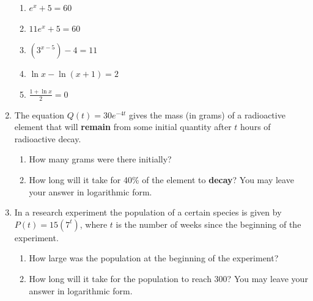 \documentclass[12pt]{article}
\newif\ifans
\begin{document}
\begin{enumerate}
\begin{enumerate}

\item $\displaystyle e^{x}+5=60$

\ifans\fbox{$x=\ln{55}$} \fi

\item $\displaystyle 11e^{x}+5=60$

\ifans\fbox{$x=\ln{5}$} \fi

\item $\displaystyle \left(3^{x-5}\right)-4=11$

\ifans\fbox{$\displaystyle x=\frac{\ln{15}}{\ln{3}}+5$} \fi

\item $\displaystyle \ln{x}-\ln{(x+1)}=2$

\ifans\fbox{No Solution} \fi

\item $\displaystyle \frac{1+\ln{x}}{2}=0$

\ifans\fbox{$\displaystyle x=e^{-1}$} \fi

\end{enumerate}

\item The equation $Q(t)=30e^{-4t}$ gives the mass (in grams) of a radioactive element that will {\bf remain} from some initial quantity after $t$ hours of radioactive decay.

\begin{enumerate}

\item How many grams were there initially?

\ifans\fbox{30 grams} \fi

\item  How long will it take for 40\% of the element to {\bf decay}?  You may leave your answer in logarithmic form.

\ifans\fbox{$\displaystyle -\frac{1}{4}\ln{\frac{3}{5}}$ hours} \fi

\end{enumerate}

\item In a research experiment the population of a certain species is given by $P(t)=15(7^t)$, where $t$ is the number of weeks since the beginning of the experiment.

\begin{enumerate}

\item How large was the population at the beginning of the experiment?

\ifans\fbox{15} \fi

\item How long will it take for the population to reach 300?  You may leave your answer in logarithmic form.

\ifans\fbox{$\displaystyle \frac{\ln{20}}{\ln{7}}$ weeks} \fi

\end{enumerate}

\end{enumerate}
\end{document}

